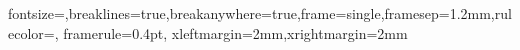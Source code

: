 \newcommand{\fignone}[3]{%
  \begin{figure}[H]\centering
  \fbox{\parbox[c][20mm][c]{0.92\linewidth}{\centering\color{black!45}\small 图 #1 待补：需实拍照片或工程截图}}%
  \renewcommand{\thefigure}{#1}%
  \caption{#2}\label{fig:#1}\par\vspace{0.5mm}
  \begin{minipage}{0.96\textwidth}{\footnotesize\color{black!70}#3}\end{minipage}
  \end{figure}}
\newcommand{\figplaceholder}[3]{%
  \begin{figure}[H]\centering
    \fbox{\parbox[c][3.4cm][c]{0.88\textwidth}{\centering\color{figc}%
      \textbf{图 #1 占位}\\[1mm]\footnotesize 待绘制（TikZ / pgfplots 或实拍）}}
    \caption{#2}\label{fig:#1}
  \end{figure}
  \vspace{-2mm}
  {\footnotesize\noindent\color{black!70}#3\par}\vspace{2mm}}

%
   {fontsize=\scriptsize,breaklines=true,breakanywhere=true,frame=single,framesep=1.2mm,rulecolor=\color{black!30},%
   framerule=0.4pt, xleftmargin=2mm,xrightmargin=2mm}

